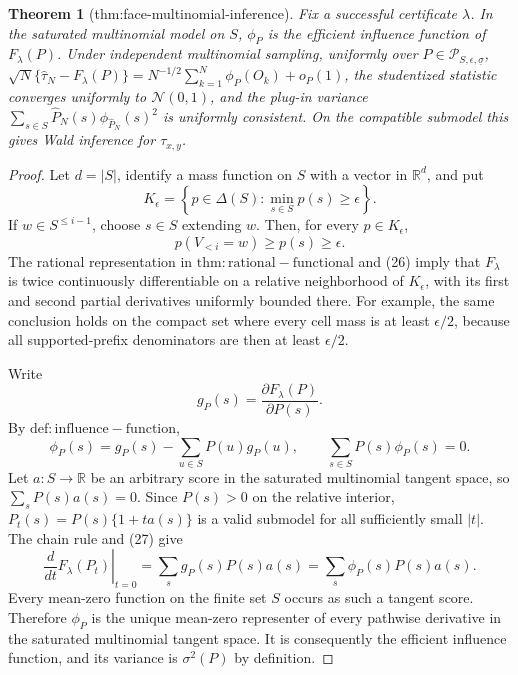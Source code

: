 \documentclass{article}
\newtheorem{theorem}{Theorem}
\begin{document}
\begin{theorem}[thm:face-multinomial-inference]\label{thm:face-multinomial-inference}
Fix a successful certificate \(\lambda\). In the saturated multinomial model on \(S\), \(\phi_P\) is the efficient influence function of \(F_{\lambda}(P)\). Under independent multinomial sampling, uniformly over \(P\in\mathcal P_{S,\epsilon,\underline\sigma}\), \(\sqrt N\{\widehat\tau_N-F_{\lambda}(P)\}=N^{-1/2}\sum_{k=1}^N\phi_P(O_k)+o_P(1)\), the studentized statistic converges uniformly to \(\mathcal N(0,1)\), and the plug-in variance \(\sum_{s\in S}\widehat P_N(s)\phi_{\widehat P_N}(s)^2\) is uniformly consistent. On the compatible submodel this gives Wald inference for \(\tau_{x,y}\).
\end{theorem}
\begin{proof}
Let \(d=|S|\), identify a mass function on \(S\) with a vector in \(\mathbb R^d\), and put
\[
K_\epsilon=\left\{p\in\Delta(S):\min_{s\in S}p(s)\ge\epsilon\right\}.
\]
If \(w\in S^{\le i-1}\), choose \(s\in S\) extending \(w\).  Then, for every \(p\in K_\epsilon\),
\[
p(V_{<i}=w)\ge p(s)\ge\epsilon.                              \tag{26}
\]
The rational representation in \(\mathrm{thm:rational-functional}\) and (26) imply that \(F_\lambda\) is twice continuously differentiable on a relative neighborhood of \(K_\epsilon\), with its first and second partial derivatives uniformly bounded there.  For example, the same conclusion holds on the compact set where every cell mass is at least \(\epsilon/2\), because all supported-prefix denominators are then at least \(\epsilon/2\).

Write
\[
g_P(s)=\frac{\partial F_\lambda(P)}{\partial P(s)}.
\]
By \(\mathrm{def:influence-function}\),
\[
\phi_P(s)=g_P(s)-\sum_{u\in S}P(u)g_P(u),
\qquad
\sum_{s\in S}P(s)\phi_P(s)=0.                               \tag{27}
\]
Let \(a:S\to\mathbb R\) be an arbitrary score in the saturated multinomial tangent space, so \(\sum_sP(s)a(s)=0\).  Since \(P(s)>0\) on the relative interior, \(P_t(s)=P(s)\{1+t a(s)\}\) is a valid submodel for all sufficiently small \(|t|\).  The chain rule and (27) give
\[
\left.\frac{d}{dt}F_\lambda(P_t)\right|_{t=0}
=\sum_sg_P(s)P(s)a(s)
=\sum_s\phi_P(s)P(s)a(s).                                    \tag{28}
\]
Every mean-zero function on the finite set \(S\) occurs as such a tangent score.  Therefore \(\phi_P\) is the unique mean-zero representer of every pathwise derivative in the saturated multinomial tangent space.  It is consequently the efficient influence function, and its variance is \(\sigma^2(P)\) by definition.


\end{proof}
\end{document}
